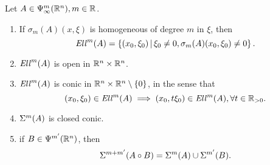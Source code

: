 \documentclass{article}
\begin{document}
\begin{flemma}
    Let $A \in \Psi^m_\infty({\mathbb R}^n), m \in {\ensuremath {\mathbb R}}$. 
    \begin{enumerate}
        \item If $\sigma_m(A)(x, \xi)$ is homogeneous of degree $m$ in $\xi$, then 
        \[
        \mathit{Ell}^m(A) = \left\{(x_0, \xi_0) \, | \,  \xi_0 \neq 0, \sigma_m(A)(x_0, \xi_0) \neq 0\right\}. 
        \]
        \item $\mathit{Ell}^m(A) $ is open in ${\mathbb R}^n \times {\ensuremath {\mathbb R}}^n$. 
        \item $\mathit{Ell}^m(A)$ is conic in ${\mathbb R}^n \times {\ensuremath {\mathbb R}}^n \setminus \left\{0\right\}$, in the sense that 
        \[(x_0, \xi_0) \in \mathit{Ell}^m(A) \implies (x_0, t \xi_0) \in \mathit{Ell}^m(A), \forall t \in {\ensuremath {\mathbb R}}_{>0}.\] 
        \item $\Sigma^m(A)$ is closed conic. 
        \item if $B \in \Psi^{m'}({\mathbb R}^n)$, then 
        \[\Sigma^{m + m'}(A \circ B) = \Sigma^m(A) \cup \Sigma^{m'}(B).\]
    \end{enumerate}
\end{flemma}
\end{document}
